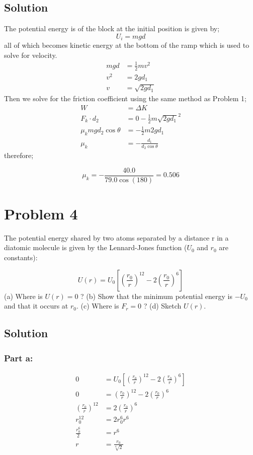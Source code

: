 \documentclass{article}
\begin{document}
\subsection*{Solution}
The potential energy is of the block at the initial position is given by;
\[
	U_i = mgd
\]
all of which becomes kinetic energy at the bottom of the ramp which is used to solve for velocity.
\begin{align*}
	mgd &= \frac{1}{2} mv^2 \\
	v^2 &= 2gd_1 \\
	v &= \sqrt{2gd_1}
\end{align*}
Then we solve for the friction coefficient using the same method as Problem 1;
\begin{align*}
	W &= \Delta K \\
	F_k \cdot d_2 &= 0 - \frac{1}{2}m \sqrt{2gd_1}^2 \\
	\mu_k mg d_2 \cos \theta &= - \frac{1}{2}m2gd_1 \\
	\mu_k &= -\frac{d_1}{d_2 \cos \theta}
\end{align*}
therefore;

\[
	\mu_k = -\frac{40.0}{79.0 \cos (180)} = \boxed{0.506}
\]

\section*{Problem 4}
The potential energy shared by two atoms separated by a distance r in a diatomic molecule is given by the
Lennard-Jones function ($U_0$ and $r_0$ are constants):

\[
	U(r) = U_0 \left[ \left( \frac{r_0}{r} \right)^{12} - 2 \left( \frac{r_0}{r}\right)^6 \right]
\]
(a) Where is $U(r)=0$ ? (b) Show that the minimum potential energy is $-U_0$ and that it occurs at $r_0$. (c)
Where is $F_r = 0$ ? (d) Sketch $U(r)$.

\subsection*{Solution}
\subsubsection*{Part a:}
\begin{align*}
	0 &= U_0 \left[ \left( \frac{r_0}{r} \right)^{12} - 2 \left( \frac{r_0}{r}\right)^6 \right] \\
	0 &= \left( \frac{r_0}{r} \right)^{12} - 2 \left( \frac{r_0}{r}\right)^6 \\
	\left( \frac{r_0}{r} \right)^{12} &= 2 \left( \frac{r_0}{r}\right)^6 \\
	r_0^{12} &= 2 r_0^6 r^6 \\
	\frac{r_0^6}{2} &= r^6 \\
	r &= \frac{r_0}{\sqrt[6]{2}}
\end{align*}
\end{document}
